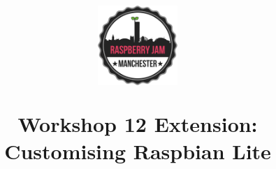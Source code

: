\documentclass[a4paper, twocolumn, twoside, 11pt]{article}
\begin{document}
	\author{}
	\title{
		\begin{center}
			\includegraphics[width=30mm]{common/logo-512}
		\end{center}
		\vspace{12pt}
		Workshop 12 Extension: Customising Raspbian Lite}
	\date{}
	\maketitle
	
	\setcounter{tocdepth}{1}
	\tableofcontents
	
	
	\newpage
	
		
	
\end{document}

